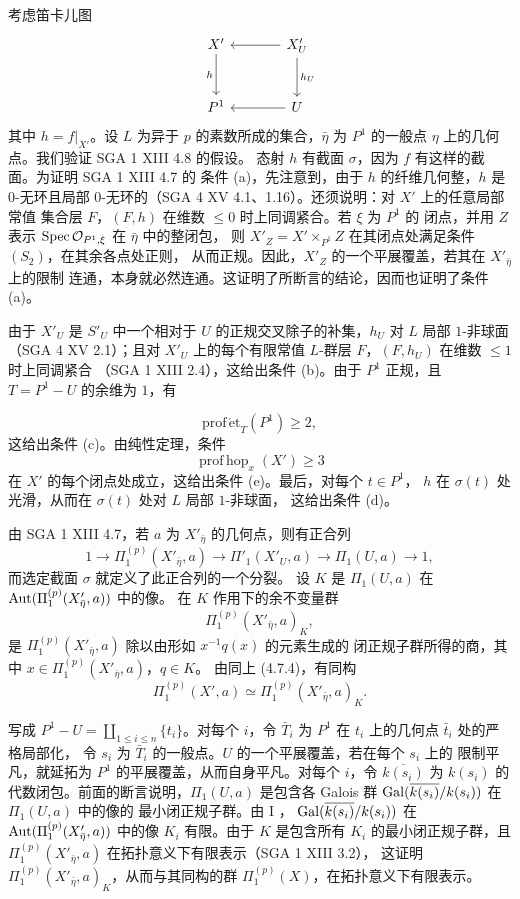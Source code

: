 考虑笛卡儿图
\[
\begin{tikzcd}[column sep=large,row sep=large]
X' \arrow[d,"h"'] & X'_U \arrow[l] \arrow[d,"h_U"] \\
P^1 & U \arrow[l]
\end{tikzcd}
\]
其中 $h=f|_{X'}$。设 $L$ 为异于 $p$ 的素数所成的集合，$\bar\eta$ 为
$P^1$ 的一般点 $\eta$ 上的几何点。我们验证 SGA 1 XIII 4.8 的假设。
态射 $h$ 有截面 $\sigma$，因为 $f$ 有这样的截面。为证明 SGA 1 XIII 4.7 的
条件 (a)，先注意到，由于 $h$ 的纤维几何整，$h$ 是 $0$-无环且局部
$0$-无环的（SGA 4 XV 4.1、1.16）。还须说明：对 $X'$ 上的任意局部常值
集合层 $F$，$(F,h)$ 在维数 $\leq 0$ 时上同调紧合。若 $\xi$ 为 $P^1$ 的
闭点，并用 $Z$ 表示 $\operatorname{Spec}\mathcal O_{P^1,\xi}$ 在 $\bar\eta$ 中的整闭包，
则 $X'_Z=X'\times_{P^1}Z$ 在其闭点处满足条件 $(S_2)$，在其余各点处正则，
从而正规。因此，$X'_Z$ 的一个平展覆盖，若其在 $X'_{\bar\eta}$ 上的限制
连通，本身就必然连通。这证明了所断言的结论，因而也证明了条件 (a)。

由于 $X'_U$ 是 $S'_U$ 中一个相对于 $U$ 的正规交叉除子的补集，$h_U$
对 $L$ 局部 $1$-非球面（SGA 4 XV 2.1）；且对 $X'_U$ 上的每个有限常值
$L$-群层 $F$，$(F,h_U)$ 在维数 $\leq 1$ 时上同调紧合
（SGA 1 XIII 2.4），这给出条件 (b)。由于 $P^1$ 正规，且
$T=P^1-U$ 的余维为 $1$，有


\[
 \operatorname{prof\,\acute et}_T(P^1)\geq 2,
\]
这给出条件 (c)。由纯性定理，条件
\[
 \operatorname{prof\,hop}_x(X')\geq 3
\]
在 $X'$ 的每个闭点处成立，这给出条件 (e)。最后，对每个 $t\in P^1$，
$h$ 在 $\sigma(t)$ 处光滑，从而在 $\sigma(t)$ 处对 $L$ 局部 $1$-非球面，
这给出条件 (d)。

由 SGA 1 XIII 4.7，若 $a$ 为 $X'_{\bar\eta}$ 的几何点，则有正合列
\[
 1\longrightarrow\Pi_1^{(p)}(X'_{\bar\eta},a)
 \longrightarrow\Pi'_1(X'_U,a)
 \longrightarrow\Pi_1(U,a)\longrightarrow 1,
\]
而选定截面 $\sigma$ 就定义了此正合列的一个分裂。
设 $K$ 是 $\Pi_1(U,a)$ 在 $\operatorname{Aut}(\Pi_1^{(p)}(X'_{\bar\eta},a))$ 中的像。
在 $K$ 作用下的余不变量群
\[
 \Pi_1^{(p)}(X'_{\bar\eta},a)_K,
\]
是 $\Pi_1^{(p)}(X'_{\bar\eta},a)$ 除以由形如 $x^{-1}q(x)$ 的元素生成的
闭正规子群所得的商，其中 $x\in\Pi_1^{(p)}(X'_{\bar\eta},a)$，$q\in K$。
由同上 (4.7.4)，有同构
\[
 \Pi_1^{(p)}(X',a)\simeq
 \Pi_1^{(p)}(X'_{\bar\eta},a)_K.
\]

写成 $P^1-U=\coprod_{1\leq i\leq n}\{t_i\}$。对每个 $i$，令
$\bar T_i$ 为 $P^1$ 在 $t_i$ 上的几何点 $\bar t_i$ 处的严格局部化，
令 $s_i$ 为 $\bar T_i$ 的一般点。$U$ 的一个平展覆盖，若在每个 $s_i$ 上的
限制平凡，就延拓为 $P^1$ 的平展覆盖，从而自身平凡。对每个 $i$，令
$\overline{k(s_i)}$ 为 $k(s_i)$ 的代数闭包。前面的断言说明，$\Pi_1(U,a)$
是包含各 Galois 群 $\operatorname{Gal}(\overline{k(s_i)}/k(s_i))$ 在 $\Pi_1(U,a)$ 中的像的
最小闭正规子群。由 I ，
$\operatorname{Gal}(\overline{k(s_i)}/k(s_i))$ 在 $\operatorname{Aut}(\Pi_1^{(p)}(X'_{\bar\eta},a))$ 中的像
$K_i$ 有限。由于 $K$ 是包含所有 $K_i$ 的最小闭正规子群，且
$\Pi_1^{(p)}(X'_{\bar\eta},a)$ 在拓扑意义下有限表示（SGA 1 XIII 3.2），
这证明 $\Pi_1^{(p)}(X'_{\bar\eta},a)_K$，从而与其同构的群
$\Pi_1^{(p)}(X)$，在拓扑意义下有限表示。

